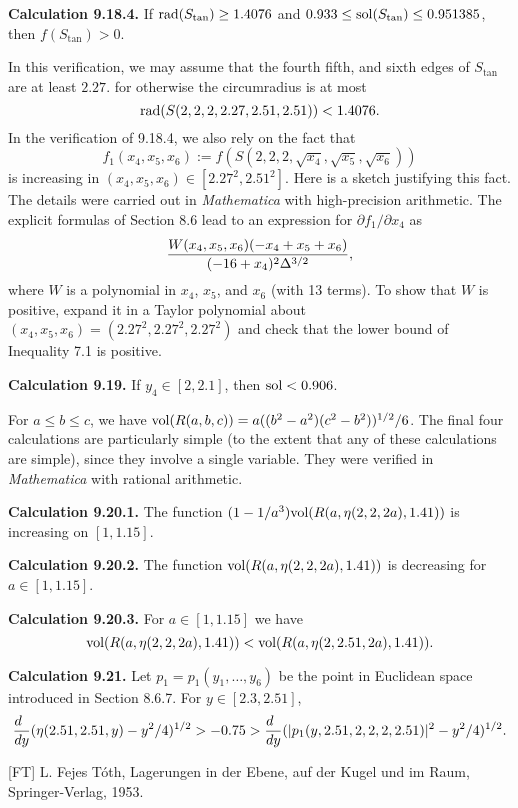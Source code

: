 {\bf Calculation 9.18.4.}  If $\operatorname{rad}(S_{\tan})\ge 1.4076$
and $0.933\le \operatorname{sol}(S_{\tan})\le 0.951385$, then $f(S_{\tan})>0$.

In this verification, we may assume that the fourth
fifth, and sixth edges of $S_{\tan}$ are at least $2.27$.
for otherwise the circumradius is at most 
$$\operatorname{rad}(S(2,2,2,2.27,2.51,2.51))
< 1.4076.$$
In the verification of 9.18.4, we also rely on the fact that
$$f_1(x_4,x_5,x_6):= f(S(2,2,2,\sqrt{x_4},\sqrt{x_5},\sqrt{x_6}))$$
is increasing in $(x_4,x_5,x_6)\in [2.27^2,2.51^2]$.  Here is
a sketch justifying this fact.  The details were carried out
in {\it Mathematica\/} with high-precision arithmetic.
The explicit formulas of Section 8.6 lead to an expression for
$\partial f_1/\partial x_4$ as
$${W(x_4,x_5,x_6)(-x_4+x_5+x_6)\over (-16+x_4)^2 \Delta^{3/2}},$$
where $W$ is a polynomial in $x_4$, $x_5$, and $x_6$
(with 13 terms).  To show that
$W$ is positive, expand it in a 
Taylor polynomial about $(x_4,x_5,x_6)=(2.27^2,2.27^2,2.27^2)$
and check that the lower bound of Inequality 7.1 is positive.

\bigskip


{\bf Calculation 9.19.}  If $y_4\in[2,2.1]$, then $\operatorname{sol}<0.906$.

For $a\le b\le c$, we have $\hbox{vol}(R(a,b,c)) 
= a((b^2-a^2)(c^2-b^2))^{1/2}/6$.
 The final four calculations
are particularly simple (to the extent that
any of these calculations are simple), 
since they involve a single variable.
They were verified in {\it Mathematica\/} with rational arithmetic.

{\bf Calculation 9.20.1.}  The function $(1-1/a^3)\hbox{vol}(R(a,\eta(2,2,2a),1.41))$
is increasing on $[1,1.15]$. 

{\bf Calculation 9.20.2.}  The function $\hbox{vol}(R(a,\eta(2,2,2a),1.41))$
is decreasing for $a\in [1,1.15]$. 


{\bf Calculation 9.20.3.}  For $a\in[1,1.15]$ we have
$$\hbox{vol}(R(a,\eta(2,2,2a),1.41))< 
\hbox{vol}(R(a,\eta(2,2.51,2a),1.41)).$$

{\bf Calculation 9.21.}  Let $p_1=p_1(y_1,\ldots,y_6)$ 
be the point in Euclidean
space 
introduced in Section 8.6.7. For $y\in [2.3,2.51]$, 
$${d\phantom{d}\over dy} (\eta(2.51,2.51,y)-y^2/4)^{1/2}
  > -0.75 >  {d\phantom{d}\over dy} (|p_1(y,2.51,2,2,2,2.51)|^2
   - y^2/4)^{1/2}.$$


\vfill\eject
\bigskip
\Refs


[FT] L. Fejes T\'oth, Lagerungen in der Ebene, auf der Kugel
	und im Raum, Springer-Verlag, 1953.

